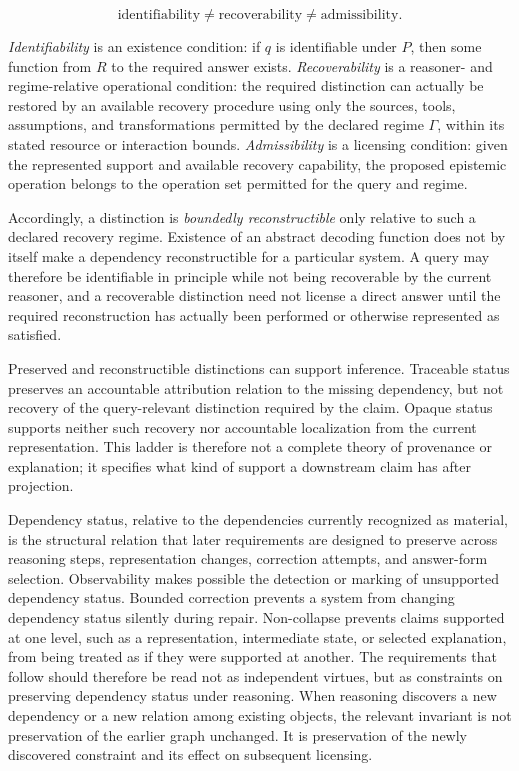\documentclass[11pt]{article}
\theoremstyle{definition}
\theoremstyle{remark}
\begin{document}
\[
\boxed{
\text{identifiability}
\neq
\text{recoverability}
\neq
\text{admissibility}.
}
\]

\emph{Identifiability} is an existence condition: if \(q\) is identifiable under \(P\), then some function from \(R\) to the required answer exists. \emph{Recoverability} is a reasoner- and regime-relative operational condition: the required distinction can actually be restored by an available recovery procedure using only the sources, tools, assumptions, and transformations permitted by the declared regime \(\Gamma\), within its stated resource or interaction bounds. \emph{Admissibility} is a licensing condition: given the represented support and available recovery capability, the proposed epistemic operation belongs to the operation set permitted for the query and regime.

Accordingly, a distinction is \emph{boundedly reconstructible} only relative to such a declared recovery regime. Existence of an abstract decoding function does not by itself make a dependency reconstructible for a particular system. A query may therefore be identifiable in principle while not being recoverable by the current reasoner, and a recoverable distinction need not license a direct answer until the required reconstruction has actually been performed or otherwise represented as satisfied.

Preserved and reconstructible distinctions can support inference. Traceable status preserves an accountable attribution relation to the missing dependency, but not recovery of the query-relevant distinction required by the claim. Opaque status supports neither such recovery nor accountable localization from the current representation. This ladder is therefore not a complete theory of provenance or explanation; it specifies what kind of support a downstream claim has after projection.

Dependency status, relative to the dependencies currently recognized as material, is the structural relation that later requirements are designed to preserve across reasoning steps, representation changes, correction attempts, and answer-form selection. Observability makes possible the detection or marking of unsupported dependency status. Bounded correction prevents a system from changing dependency status silently during repair. Non-collapse prevents claims supported at one level, such as a representation, intermediate state, or selected explanation, from being treated as if they were supported at another. The requirements that follow should therefore be read not as independent virtues, but as constraints on preserving dependency status under reasoning. When reasoning discovers a new dependency or a new relation among existing objects, the relevant invariant is not preservation of the earlier graph unchanged. It is preservation of the newly discovered constraint and its effect on subsequent licensing.
\end{document}
